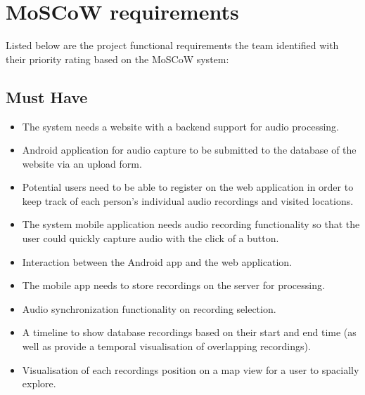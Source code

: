\documentclass{l3proj}
\begin{document}
\section{MoSCoW requirements}
Listed below are the project functional requirements the team identified with their priority rating based on the MoSCoW system:

\subsection{Must Have}


	\begin{itemize}

	\item {} The system needs a website with a backend support for audio processing.

	\item {} Android application for audio capture to be submitted to the database of the website via an upload form.

	\item {} Potential users need to be able to register on the web application in order to keep track of each person's individual audio recordings and visited locations.

	\item {} The system mobile application needs audio recording functionality so that the user could quickly capture audio with the click of a button.

	\item {} Interaction between the Android app and the web application.

	\item {} The mobile app needs to store recordings on the server for processing.

	\item {} Audio synchronization functionality on recording selection.

	\item {} A timeline to show database recordings based on their start and end time (as well as provide a temporal visualisation of overlapping recordings).

	\item {} Visualisation of each recordings position on a map view for a user to spacially explore.

	\end{itemize}
\end{document}
